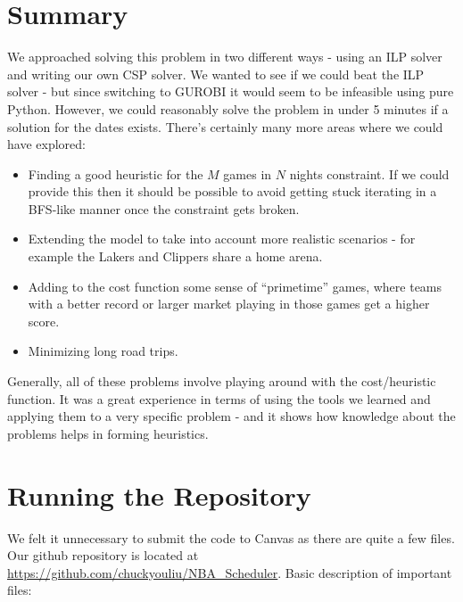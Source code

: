 \documentclass{article}
\begin{document}
    \section{Summary}
    We approached solving this problem in two different ways - using an ILP solver and writing our own CSP solver. We wanted to see if we could beat the ILP solver - but since switching to GUROBI it would seem to be infeasible using pure Python. However, we could reasonably solve the problem in under 5 minutes if a solution for the dates exists. There's certainly many more areas where we could have explored:

    \begin{itemize}
    	\item Finding a good heuristic for the $M$ games in $N$ nights constraint. If we could provide this then it should be possible to avoid getting stuck iterating in a BFS-like manner once the constraint gets broken.
    	\item Extending the model to take into account more realistic scenarios - for example the Lakers and Clippers share a home arena.
    	\item Adding to the cost function some sense of ``primetime'' games, where teams with a better record or larger market playing in those games get a higher score.
    	\item Minimizing long road trips.
    \end{itemize}

    Generally, all of these problems involve playing around with the cost/heuristic function. It was a great experience in terms of using the tools we learned and applying them to a very specific problem - and it shows how knowledge about the problems helps in forming heuristics.

	\section{Running the Repository}
	We felt it unnecessary to submit the code to Canvas as there are quite a few files. Our github repository is located at \url{https://github.com/chuckyouliu/NBA_Scheduler}. Basic description of important files:
\end{document}
